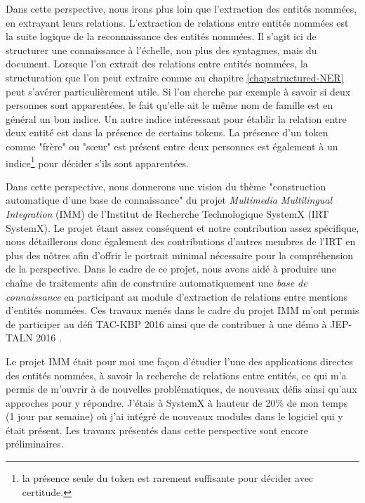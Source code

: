 \documentclass[PhD-Yoann-Dupont.tex]{subfiles}
\begin{document}
Dans cette perspective, nous irons plus loin que l'extraction des entités nommées, en extrayant leurs relations. L'extraction de relations entre entités nommées est la suite logique de la reconnaissance des entités nommées. Il s'agit ici de structurer une connaissance à l'échelle, non plus des syntagmes, mais du document. Lorsque l'on extrait des relations entre entités nommées, la structuration que l'on peut extraire comme au chapitre \ref{chap:structured-NER} peut s'avérer particulièrement utile. Si l'on cherche par exemple à savoir si deux personnes sont apparentées, le fait qu'elle ait le même nom de famille est en général un bon indice. Un autre indice intéressant pour établir la relation entre deux entité est dans la présence de certains tokens. La présence d'un token comme "frère" ou "s\oe ur" est présent entre deux personnes est également à un indice\footnote{la présence seule du token est rarement suffisante pour décider avec certitude.} pour décider s'ils sont apparentées.

Dans cette perspective, nous donnerons une vision du thème "construction automatique d'une base de connaissance" du projet \textit{Multimedia Multilingual Integration} (IMM) de l'Institut de Recherche Technologique SystemX (IRT SystemX). Le projet étant assez conséquent et notre contribution assez spécifique, nous détaillerons donc également des contributions d'autres membres de l'IRT en plus des nôtres afin d'offrir le portrait minimal nécessaire pour la compréhension de la perspective. Dans le cadre de ce projet, nous avons aidé à produire une chaîne de traitements afin de construire automatiquement une \emph{base de connaissance} en participant au module d'extraction de relations entre mentions d'entités nommées. Ces travaux menés dans le cadre du projet IMM m'ont permis de participer au défi TAC-KBP 2016 \citep{rahman2017tac} ainsi que de contribuer à une démo à JEP-TALN 2016 \citep{mesnard2016}.


Le projet IMM était pour moi une façon d'étudier l'une des applications directes des entités nommées, à savoir la recherche de relations entre entités, ce qui m'a permis de m'ouvrir à de nouvelles problématiques, de nouveaux défis ainsi qu'aux approches pour y répondre. J'étais à SystemX à hauteur de 20\% de mon temps (1 jour par semaine) où j'ai intégré de nouveaux modules dans le logiciel qui y était présent. Les travaux présentés dans cette perspective sont encore préliminaires.
\end{document}
